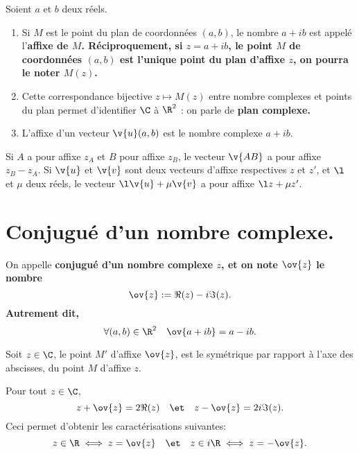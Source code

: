 \documentclass[11pt]{article}
\begin{document}
\begin{defi}{}{}
    Soient $a$ et $b$ deux réels.
    \begin{enumerate}
        \item Si $M$ est le point du plan de coordonnées $(a,b)$, le nombre $a+ib$ est appelé l'\bf{affixe} de $M$. Réciproquement, si $z=a+ib$, le point $M$ de coordonnées $(a,b)$ est l'unique point du plan d'affixe $z$, on pourra le noter $M(z)$.
        \item Cette correspondance bijective $z\mapsto M(z)$ entre nombre complexes et points du plan permet d'identifier $\C$ à $\R^2$ : on parle de \bf{plan complexe}.
        \item L'affixe d'un vecteur $\v{u}(a,b)$ est le nombre complexe $a+ib$.
    \end{enumerate}
\end{defi}

\begin{prop}{}{}
    Si $A$ a pour affixe $z_A$ et $B$ pour affixe $z_B$, le vecteur $\v{AB}$ a pour affixe $z_B-z_A$.\n
    Si $\v{u}$ et $\v{v}$ sont deux vecteurs d'affixe respectives $z$ et $z'$, et $\l$ et $\mu$ deux réels, le vecteur $\l\v{u}+\mu\v{v}$ a pour affixe $\l z + \mu z'$.
\end{prop}

\section{Conjugué d'un nombre complexe.}

\begin{defi}{}{}
    On appelle \bf{conjugué} d'un nombre complexe $z$, et on note $\ov{z}$ le nombre
    \begin{equation*}
        \ov{z}:=\Re(z)-i\Im(z).
    \end{equation*}
    Autrement dit,
    \begin{equation*}
        \forall (a,b)\in\R^2\quad\ov{a+ib}=a-ib.
    \end{equation*}
\end{defi}

Soit $z\in\C$, le point $M'$ d'affixe $\ov{z}$, est le symétrique par rapport à l'axe des abscisses, du point $M$ d'affixe $z$.

\begin{prop}{}{}
    Pour tout $z\in\C$,
    \begin{equation*}
        z+\ov{z}=2\Re(z)\quad\et\quad z-\ov{z}=2i\Im(z).
    \end{equation*}
    Ceci permet d'obtenir les caractérisations suivantes:
    \begin{equation*}
        z\in\R \iff z=\ov{z}\quad\et\quad z\in i\R\iff z=-\ov{z}.
    \end{equation*}
\end{prop}
\end{document}
